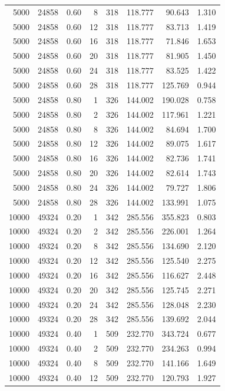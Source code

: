 \begin{longtable}{rrrrrrrr}
5000 & 24858 & 0.60 &  8 & 318 & 118.777 & 90.643 & 1.310 \\
5000 & 24858 & 0.60 & 12 & 318 & 118.777 & 83.713 & 1.419 \\
5000 & 24858 & 0.60 & 16 & 318 & 118.777 & 71.846 & 1.653 \\
5000 & 24858 & 0.60 & 20 & 318 & 118.777 & 81.905 & 1.450 \\
5000 & 24858 & 0.60 & 24 & 318 & 118.777 & 83.525 & 1.422 \\
5000 & 24858 & 0.60 & 28 & 318 & 118.777 & 125.769 & 0.944 \\
5000 & 24858 & 0.80 &  1 & 326 & 144.002 & 190.028 & 0.758 \\
5000 & 24858 & 0.80 &  2 & 326 & 144.002 & 117.961 & 1.221 \\
5000 & 24858 & 0.80 &  8 & 326 & 144.002 & 84.694 & 1.700 \\
5000 & 24858 & 0.80 & 12 & 326 & 144.002 & 89.075 & 1.617 \\
5000 & 24858 & 0.80 & 16 & 326 & 144.002 & 82.736 & 1.741 \\
5000 & 24858 & 0.80 & 20 & 326 & 144.002 & 82.614 & 1.743 \\
5000 & 24858 & 0.80 & 24 & 326 & 144.002 & 79.727 & 1.806 \\
5000 & 24858 & 0.80 & 28 & 326 & 144.002 & 133.991 & 1.075 \\
10000 & 49324 & 0.20 &  1 & 342 & 285.556 & 355.823 & 0.803 \\
10000 & 49324 & 0.20 &  2 & 342 & 285.556 & 226.001 & 1.264 \\
10000 & 49324 & 0.20 &  8 & 342 & 285.556 & 134.690 & 2.120 \\
10000 & 49324 & 0.20 & 12 & 342 & 285.556 & 125.540 & 2.275 \\
10000 & 49324 & 0.20 & 16 & 342 & 285.556 & 116.627 & 2.448 \\
10000 & 49324 & 0.20 & 20 & 342 & 285.556 & 125.745 & 2.271 \\
10000 & 49324 & 0.20 & 24 & 342 & 285.556 & 128.048 & 2.230 \\
10000 & 49324 & 0.20 & 28 & 342 & 285.556 & 139.692 & 2.044 \\
10000 & 49324 & 0.40 &  1 & 509 & 232.770 & 343.724 & 0.677 \\
10000 & 49324 & 0.40 &  2 & 509 & 232.770 & 234.263 & 0.994 \\
10000 & 49324 & 0.40 &  8 & 509 & 232.770 & 141.166 & 1.649 \\
10000 & 49324 & 0.40 & 12 & 509 & 232.770 & 120.793 & 1.927 \\

\end{longtable}
